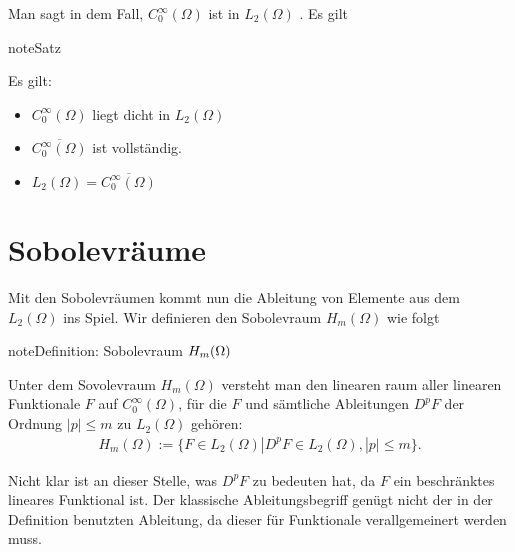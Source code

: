 \documentclass[letterpaper,10pt,english]{jupyterBook}
\begin{document}
Man sagt in dem Fall, \(C_0^\infty(\Omega)\) ist in \(L_2(\Omega)\) . Es gilt

\begin{sphinxadmonition}{note}{Satz}

Es gilt:
\begin{itemize}
\item {} 
\(C_0^\infty(\Omega)\) liegt dicht in \(L_2(\Omega)\)

\item {} 
\(\overline{C_0^\infty(\Omega)}\) ist vollständig.

\item {} 
\(L_2(\Omega) = \overline{C_0^\infty(\Omega)}\)

\end{itemize}
\end{sphinxadmonition}


\section{Sobolevräume}
\label{\detokenize{Funktionalanalysis/Sobolevraeume:id1}}
Mit den Sobolevräumen kommt nun die Ableitung von Elemente aus dem \(L_2(\Omega)\) ins Spiel. Wir definieren den Sobolevraum \(H_m(\Omega)\) wie folgt

\begin{sphinxadmonition}{note}{Definition: Sobolevraum \protect\(H_m(\Omega)\protect\)}

Unter dem Sovolevraum \(H_m(\Omega)\) versteht man den linearen raum aller linearen Funktionale \(F\) auf \(C_0^\infty(\Omega)\), für die \(F\) und sämtliche Ableitungen \(D^pF\) der Ordnung \(|p|\le m\) zu \(L_2(\Omega)\) gehören:
\begin{equation*}
\begin{split}H_m(\Omega) := \{F\in L_2(\Omega) | D^p F \in L_2(\Omega), |p|\le m\}.\end{split}
\end{equation*}\end{sphinxadmonition}

Nicht klar ist an dieser Stelle, was \(D^p F\) zu bedeuten hat, da \(F\) ein beschränktes lineares Funktional ist. Der klassische Ableitungsbegriff genügt nicht der in der Definition benutzten Ableitung, da dieser für Funktionale verallgemeinert werden muss.
\end{document}
